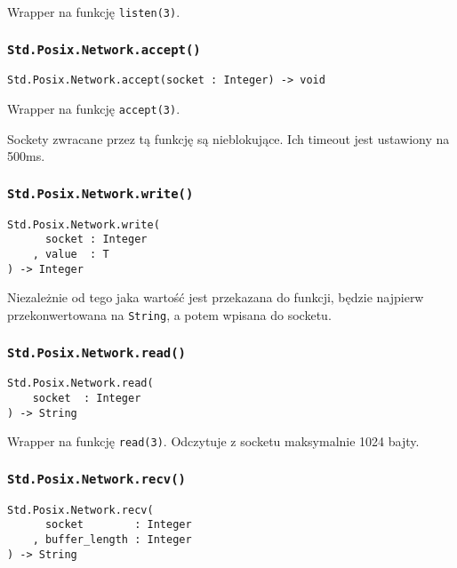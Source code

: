Wrapper na funkcję \texttt{listen(3)}.

\subsubsection{\texttt{Std.Posix.Network.accept()}}

\begin{small}
\begin{lstlisting}
Std.Posix.Network.accept(socket : Integer) -> void
\end{lstlisting}
\end{small}

Wrapper na funkcję \texttt{accept(3)}.

Sockety zwracane przez tą funkcję są nieblokujące. Ich timeout jest ustawiony na 500ms.

\subsubsection{\texttt{Std.Posix.Network.write()}}

\begin{small}
\begin{lstlisting}
Std.Posix.Network.write(
      socket : Integer
    , value  : T
) -> Integer
\end{lstlisting}
\end{small}

Niezależnie od tego jaka wartość jest przekazana do funkcji, będzie najpierw przekonwertowana na
\texttt{String}, a potem wpisana do socketu.

\subsubsection{\texttt{Std.Posix.Network.read()}}

\begin{small}
\begin{lstlisting}
Std.Posix.Network.read(
    socket  : Integer
) -> String
\end{lstlisting}
\end{small}

Wrapper na funkcję \texttt{read(3)}. Odczytuje z socketu maksymalnie 1024 bajty.

\subsubsection{\texttt{Std.Posix.Network.recv()}}

\begin{small}
\begin{lstlisting}
Std.Posix.Network.recv(
      socket        : Integer
    , buffer_length : Integer
) -> String
\end{lstlisting}
\end{small}

